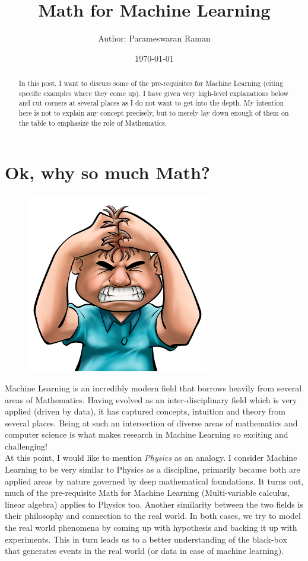 \documentclass[a4paper]{article}
\title{Math for Machine Learning}
\author{Author: Parameswaran Raman}
\date{\today}
\begin{document}

\maketitle

\begin{abstract}
\noindent In this post, I want to discuss some of the pre-requisites for Machine Learning (citing specific examples where they come up). I have given very high-level explanations below and cut corners at several places as I do not want to get into the depth. My intention here is not to explain any concept precisely, but to merely lay down enough of them on the table to emphasize the role of Mathematics.
\end{abstract}

\section{Ok, why so much Math?}

\begin{figure}[!htb]\label{fig:AngryMan}
  \centering
  \includegraphics[width=0.3\columnwidth]{Angry_man_Cartoon}\\
\end{figure}

\noindent Machine Learning is an incredibly modern field that borrows heavily from several areas of Mathematics. Having evolved as an inter-disciplinary field which is very applied (driven by data), it has captured concepts, intuition and theory from several places. Being at such an intersection of diverse areas of mathematics and computer science is what makes research in Machine Learning so exciting and challenging! \\

\noindent At this point, I would like to mention {\it Physics} as an analogy. I consider Machine Learning to be very similar to Physics as a discipline, primarily because both are applied areas by nature governed by deep mathematical foundations. It turns out, much of the pre-requisite Math for Machine Learning (Multi-variable calculus, linear algebra) applies to Physics too. Another similarity between the two fields is their philosophy and connection to the real world. In both cases, we try to model the real world phenomena by coming up with hypothesis and backing it up with experiments. This in turn leads us to a better understanding of the black-box that generates events in the real world (or data in case of machine learning). \\
\end{document}
